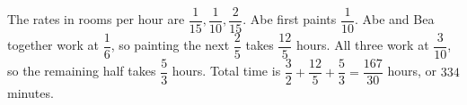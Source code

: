 The rates in rooms per hour are $\dfrac{1}{15},\dfrac{1}{10},\dfrac{2}{15}$. Abe first paints $\dfrac{1}{10}$. Abe and Bea together work at $\dfrac{1}{6}$, so painting the next $\dfrac{2}{5}$ takes $\dfrac{12}{5}$ hours. All three work at $\dfrac{3}{10}$, so the remaining half takes $\dfrac{5}{3}$ hours. Total time is $\dfrac{3}{2}+\dfrac{12}{5}+\dfrac{5}{3}=\dfrac{167}{30}$ hours, or $\boxed{334}$ minutes.

